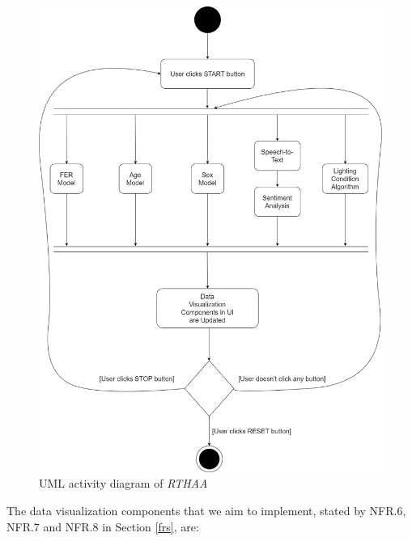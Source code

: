 \documentclass[12pt, a4paper]{article}
\begin{document}
\begin{figure}[H]
    \centering
    \includegraphics[scale=0.41]{diagrams/activitydiagram.png}
    \caption{UML activity diagram of \textit{RTHAA}}
    \label{fig:umlactivity}
\end{figure}
\clearpage

The data visualization components that we aim to implement, stated by NFR.6, NFR.7 and NFR.8 in Section \ref{frs}, are:
\end{document}
